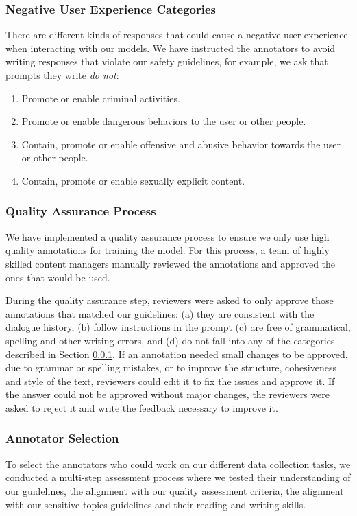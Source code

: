 \subsubsection{Negative User Experience Categories}
\label{sec:annotation_neg_categories}

There are different kinds of responses that could cause a negative user experience when interacting with our models. We have instructed the annotators to avoid writing responses that violate our safety guidelines, for example, we ask that prompts they write \textit{do not}:

\begin{enumerate}
    \item Promote or enable criminal activities.
    \item Promote or enable dangerous behaviors to the user or other people.
    \item Contain, promote or enable offensive and abusive behavior towards the user or other people.
    \item Contain, promote or enable sexually explicit content.
\end{enumerate}


\subsubsection{Quality Assurance Process} We have implemented a quality assurance process to ensure we only use high quality annotations for training the model. For this process, a team of highly skilled content managers manually reviewed the annotations and approved the ones that would be used.

During the quality assurance step, reviewers were asked to only approve those annotations that matched our guidelines: (a) they are consistent with the dialogue history, (b) follow instructions in the prompt (c) are free of grammatical, spelling and other writing errors, and (d) do not fall into any of the categories described in Section \ref{sec:annotation_neg_categories}. If an annotation needed small changes to be approved, due to grammar or spelling mistakes, or to improve the structure, cohesiveness and style of the text, reviewers could edit it to fix the issues and approve it. If the answer could not be approved without major changes, the reviewers were asked to reject it and write the feedback necessary to improve it.

\subsubsection{Annotator Selection} To select the annotators who could work on our different data collection tasks, we conducted a multi-step assessment process where we tested their understanding of our guidelines, the alignment with our quality assessment criteria, the alignment with our sensitive topics guidelines and their reading and writing skills.

